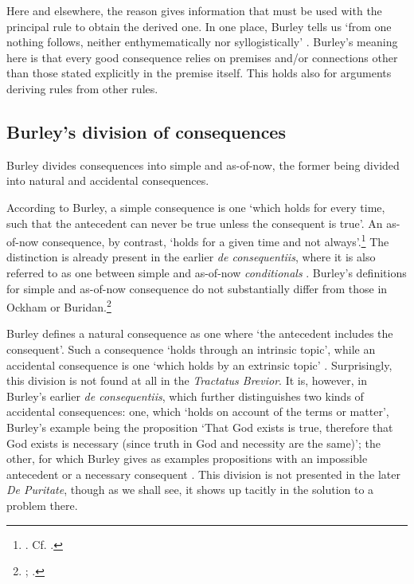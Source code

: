 	Here and elsewhere, the reason gives information that must be used with the principal rule to obtain the derived one. In one place, Burley tells us `from one nothing follows, neither enthymematically nor syllogistically' \autocite[p. 147, par. 130]{Green-Pedersen1980b}. Burley's meaning here is that every good consequence relies on premises and/or connections other than those stated explicitly in the premise itself. This holds also for arguments deriving rules from other rules. 
	
	\subsection{Burley's division of consequences}
	Burley divides consequences into simple and as-of-now, the former being divided into natural and accidental consequences. 
	
	According to Burley, a simple consequence is one `which holds for every time, such that the antecedent can never be true unless the consequent is true'. An as-of-now consequence, by contrast, `holds for a given time and not always'.\footnote{\cite[pp. 60.29-61.5]{BurleyDPAL}. Cf. \cite[p. 199.19-25]{BurleyDPAL}.} The distinction is already present in the earlier \textit{de consequentiis}, where it is also referred to as one between simple and as-of-now \textit{conditionals} \autocite[p. 128, par. 69]{Green-Pedersen1980b}. Burley's definitions for simple and as-of-now consequence do not substantially differ from those in Ockham or Buridan.\footnote{\cite[III-3. 1, pp. 587-588]{OckhamSL}; \cite[I. 4, p. 23]{BuridanTC}.}
	
	Burley defines a natural consequence as one where `the antecedent includes the consequent'. Such a consequence `holds through an intrinsic topic', while an accidental consequence is one `which holds by an extrinsic topic' \autocite[p. 61.6-10]{BurleyDPAL}. Surprisingly, this division is not found at all in the \textit{Tractatus Brevior}. It is, however, in Burley's earlier \textit{de consequentiis}, which further distinguishes two kinds of accidental consequences: one, which `holds on account of the terms or matter', Burley's example being the proposition `That God exists is true, therefore that God exists is necessary (since truth in God and necessity are the same)'; the other, for which Burley gives as examples propositions with an impossible antecedent or a necessary consequent \autocite[pp. 128-129, par. 70]{Green-Pedersen1980b}. This division is not presented in the later \textit{De Puritate}, though as we shall see, it shows up tacitly in the solution to a problem there.
	
